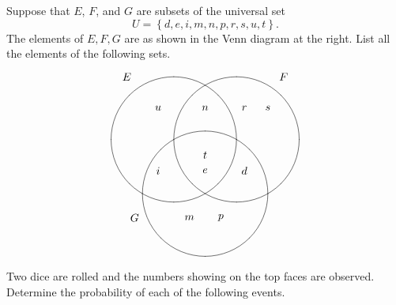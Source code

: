 \documentclass[addpoints,12pt]{exam}
\begin{document}
\begin{questions}

\begin{multicols}{2}
\question[12]
Suppose that $E$, $F$, and $G$ are subsets
of the universal set \[U=\left\{d,e,i,m,n,p,r,s,u,t\right\}.\]
The elements of
$E,F,G$ are as shown in the Venn diagram
at the right.
List all the elements of the following sets.
\[\begin{xy}<1cm,0cm>:
(-2.5,2)*{E};
(2.5,2)*{F};
(-2.25,-2.5)*{G};
(-1,0)*\cir<2cm>{};
(1,0)*\cir<2cm>{};
(0,-1.732)*\cir<2cm>{};
(-1.5,1)*{u};
(-1.5,-1)*{i};
(0,1)*{n};
(0,-.5)*{t};
(0,-1)*{e};
(1.25,1)*{r};
(1.25,-1)*{d};
(2,1)*{s};
(-.5,-2.5)*{m};
(.5,-2.5)*{p};
\end{xy}\]
\end{multicols}
\ifprintanswers\else\newpage\fi

\question[24] Two dice are rolled and the
numbers showing on the top faces are observed.
Determine the probability of each of the following events.
\end{questions}
\end{document}
